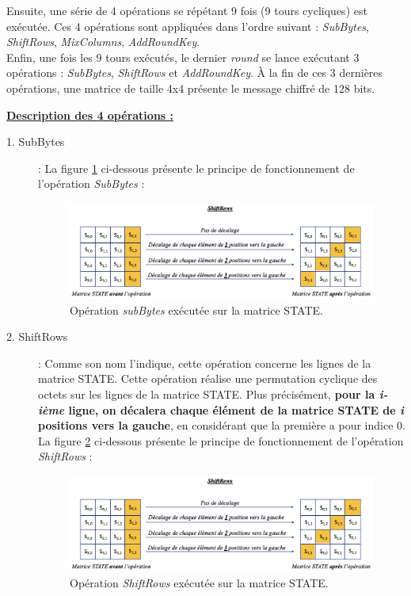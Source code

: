 \documentclass[10pt, oneside, a4paper]{article}
\begin{document}
\vspace{-0.5 cm}\hspace{-0.5 cm}Ensuite, une série de 4 opérations se répétant 9 fois (9 tours cycliques) est exécutée. Ces 4 opérations sont appliquées dans l'ordre suivant : \textit{SubBytes}, \textit{ShiftRows}, \textit{MixColumns}, \textit{AddRoundKey}. \\
Enfin, une fois les 9 tours exécutés, le dernier \textit{round} se lance exécutant 3 opérations : \textit{SubBytes}, \textit{ShiftRows} et \textit{AddRoundKey}. À la fin de ces 3 dernières opérations, une matrice de taille 4x4 présente le message chiffré de 128 bits.


\underline{\textbf{Description des 4 opérations :}} \\
\begin{description}
\item[1. SubBytes] : 
La figure \ref{fig:subByte} ci-dessous présente le principe de fonctionnement de l'opération \textit{SubBytes} :
\begin{figure}[htbp]
    \centering
    \includegraphics[width=1.05\textwidth]{image/ligne}
    \caption{Opération \textit{subBytes} exécutée sur la matrice STATE.}
    \label{fig:subByte}
\end{figure}

\item[2. ShiftRows] : Comme son nom l'indique, cette opération concerne les lignes de la matrice STATE. Cette opération réalise une permutation cyclique des octets sur les lignes de la matrice STATE. Plus précisément, \textbf{pour la \textit{i-ième} ligne, on décalera chaque élément de la matrice STATE de \textit{i} positions vers la gauche}, en considérant que la première a pour indice 0.
La figure \ref{fig:ligne} ci-dessous présente le principe de fonctionnement de l'opération \textit{ShiftRows} :
\begin{figure}[htbp]
    \centering
    \includegraphics[width=1.05\textwidth]{image/ligne}
    \caption{Opération \textit{ShiftRows} exécutée sur la matrice STATE.}
    \label{fig:ligne}
\end{figure}


\end{description}
\end{document}
